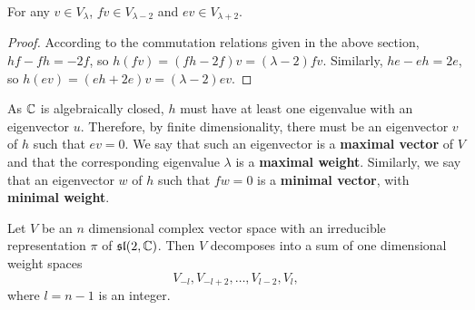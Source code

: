 \documentclass[a4paper]{article}
\begin{document}
\begin{prop}
    For any $v \in V_\lambda$, ${f} v \in V_{\lambda - 2}$ and ${e} v \in V_{\lambda + 2}$.
\end{prop}

\begin{proof}
    According to the commutation relations given in the above section, ${h}{f} - {f}{h} = -2{f}$, so ${h}({f}v) = ({f}{h} - 2{f}) v = (\lambda - 2){f}v$. Similarly, ${h}{e} - {e}{h} = 2{e}$, so ${h}({e}v) = ({e}{h} + 2{e}) v = (\lambda - 2){e}v$.
\end{proof}

As $\mathbb{C}$ is algebraically closed, ${h}$ must have at least one eigenvalue with an eigenvector $u$. Therefore, by finite dimensionality, there must be an eigenvector $v$ of ${h}$ such that ${e} v = 0$. We say that such an eigenvector is a \textbf{maximal vector} of $V$ and that the corresponding eigenvalue $\lambda$ is a \textbf{maximal weight}. Similarly, we say that an eigenvector $w$ of ${h}$ such that ${f} w = 0$ is a \textbf{minimal vector}, with \textbf{minimal weight}.

\begin{thm}
    Let $V$ be an $n$ dimensional complex vector space with an irreducible representation $\pi$ of $\mathfrak{sl}(2, \mathbb{C})$. Then $V$ decomposes into a sum of one dimensional weight spaces 
    $$V_{-l}, V_{-l + 2}, \hdots, V_{l -2}, V_{l},$$
    where $l = n - 1$ is an integer.
\end{thm}
\end{document}

